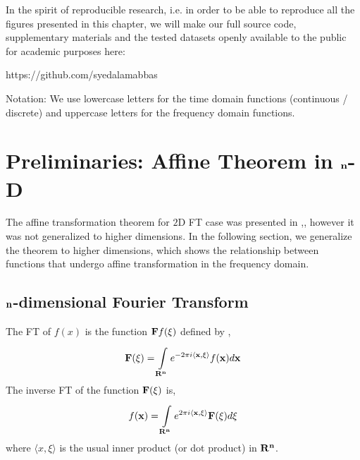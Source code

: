 \documentclass{UCF_ETD}
\begin{document}
In the spirit of reproducible research, i.e. in order to be able to reproduce all the figures presented in this chapter, we will make our full source code, supplementary materials and the tested datasets openly available to the public for academic purposes here:

 https://github.com/syedalamabbas

Notation: We use lowercase letters for the time domain functions (continuous / discrete) and uppercase letters for the frequency domain functions. 


\section{Preliminaries: Affine Theorem in ${\bf n}$-D}\label{AffineTheorem_N-D}
The affine transformation theorem for $2$D FT case was presented in \cite{Papoulis1977},\cite{Bracewell93}, however it was not generalized to higher dimensions. In the following section, we generalize the theorem to higher dimensions, which shows the relationship between functions that undergo affine transformation in the frequency domain. 

\subsection{${\bf n}$-dimensional Fourier Transform}

The FT of $f(x)$ is the function ${\bf F}f(\xi)$ defined by \cite{Bracewell86},
\begin{equation} \label{FourierDef}
{\bf F}(\xi) = \int\limits_{{\bf R^{\bf n}}}^{} e^{-2\pi i  \langle {\bf x},\xi  \rangle }f({\bf x})d{\bf x}
\end{equation} 
The inverse FT of the function ${\bf F}(\xi)$ is,
\begin{equation}\label{InvFourierDef}
 f({\bf x}) = \int\limits_{{\bf R^{\bf n}}}^{} e^{2\pi i  \langle {\bf x},\xi \rangle }{\bf F}(\xi)d\xi
\end{equation} 
where $\langle x,\xi \rangle$  is the usual inner product (or dot product) in $ {\bf R^{\bf n}} $.
\end{document}
